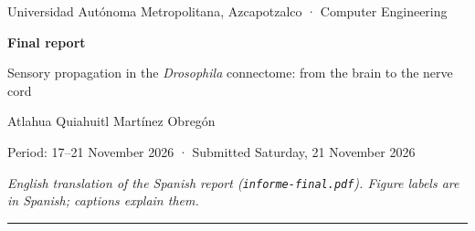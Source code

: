 \documentclass[11pt,letterpaper]{article}
\begin{document}
\begin{center}
{\small Universidad Autónoma Metropolitana, Azcapotzalco · Computer Engineering\par}
\vspace{0.5cm}
{\Large\bfseries\color{tinta} Final report\par}
\vspace{0.15cm}
{\large Sensory propagation in the \emph{Drosophila} connectome: from the brain to the nerve cord\par}
\vspace{0.4cm}
{\normalsize Atlahua Quiahuitl Martínez Obregón\par}
{\small Period: 17--21 November 2026 · Submitted Saturday, 21 November 2026\par}
{\footnotesize\itshape English translation of the Spanish report (\texttt{informe-final.pdf}). Figure labels are in Spanish; captions explain them.\par}
\vspace{0.2cm}
{\color{tinta}\rule{\linewidth}{0.6pt}}
\end{center}

\begin{abstract}
\noindent This report measures in how many steps information from each sensory modality reaches every neuron of the fruit fly and its motor neurons, using the probabilistic traversal model of \citet{schlegel2021} on two public connectomes: the FlyWire v783 brain and the BANC v888 brain and nerve cord. An independent, vectorized implementation, validated against \texttt{navis}, reproduces the layers published by \citet{dorkenwald2024} for all 13 modalities (Spearman 0.971 to 0.996), but only with the whole brain, no synapse threshold and a 15-step cap. The criteria for the BANC were fixed before opening its data. The order of layers per cell type is preserved between the two flies (Spearman 0.964 to 0.978): H2 holds. In the full central nervous system, each leg's mechanosensory neurons reach that leg's motor neurons 1.5 to 2.1 steps sooner than the closest head modality, about 3 layers beyond what 10 degree-preserving random graphs give. But the fixed criterion required 2 steps in all three legs and only the hind leg reaches it: H3 is not met as stated. The synapse threshold changes the layers (Spearman 0.88); the step cap does not. Code, figures and results are in a public repository (v0.2).
\end{abstract}
\end{document}

